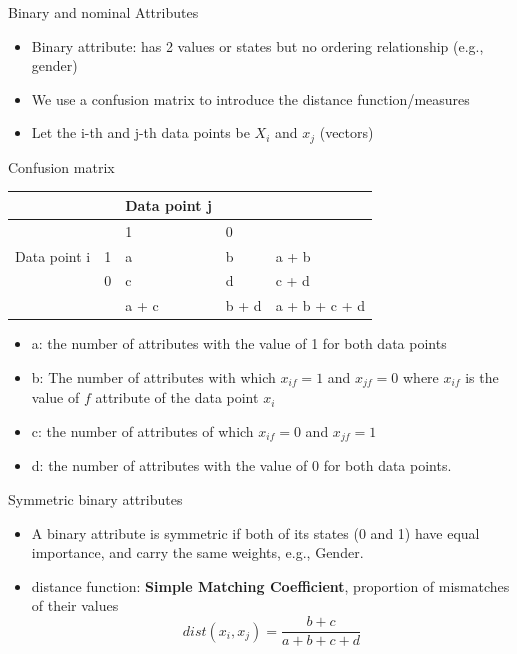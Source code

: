 \documentclass[
]{book}
\providecommand{\tightlist}{%
  \setlength{\itemsep}{0pt}\setlength{\parskip}{0pt}}
\begin{document}
Binary and nominal Attributes

\begin{itemize}
\tightlist
\item
  Binary attribute: has 2 values or states but no ordering relationship (e.g., gender)\\
\item
  We use a confusion matrix to introduce the distance function/measures\\
\item
  Let the i-th and j-th data points be \(X_i\) and \(x_j\) (vectors)
\end{itemize}

Confusion matrix

\begin{longtable}[]{@{}lllll@{}}
\toprule
& & Data point j & &\tabularnewline
\midrule
\endhead
& & 1 & 0 &\tabularnewline
Data point i & 1 & a & b & a + b\tabularnewline
& 0 & c & d & c + d\tabularnewline
& & a + c & b + d & a + b + c + d\tabularnewline
\bottomrule
\end{longtable}

\begin{itemize}
\tightlist
\item
  a: the number of attributes with the value of 1 for both data points\\
\item
  b: The number of attributes with which \(x_{if} = 1\) and \(x_{jf}=0\) where \(x_{if}\) is the value of \(f\) attribute of the data point \(x_i\)\\
\item
  c: the number of attributes of which \(x_{if}=0\) and \(x_{jf} =1\)\\
\item
  d: the number of attributes with the value of 0 for both data points.
\end{itemize}

Symmetric binary attributes

\begin{itemize}
\tightlist
\item
  A binary attribute is symmetric if both of its states (0 and 1) have equal importance, and carry the same weights, e.g., Gender.\\
\item
  distance function: \textbf{Simple Matching Coefficient}, proportion of mismatches of their values\\
  \[
  dist(x_i,x_j) = \frac{b+c}{a+b+c+d}
  \]
\end{itemize}
\end{document}
